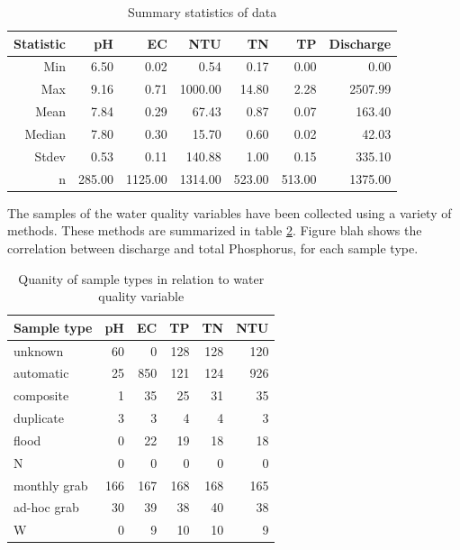 \documentclass[5p]{elsarticle}
\begin{document}
\begin{table}[ht]
\begin{center}
\caption{Summary statistics of data}
\begin{tiny}
\begin{tabular}{rrrrrrr}
  \hline
Statistic & pH & EC & NTU & TN & TP & Discharge \\ 
  \hline
Min & 6.50 & 0.02 & 0.54 & 0.17 & 0.00 & 0.00 \\ 
  Max & 9.16 & 0.71 & 1000.00 & 14.80 & 2.28 & 2507.99 \\ 
  Mean & 7.84 & 0.29 & 67.43 & 0.87 & 0.07 & 163.40 \\ 
  Median & 7.80 & 0.30 & 15.70 & 0.60 & 0.02 & 42.03 \\ 
  Stdev & 0.53 & 0.11 & 140.88 & 1.00 & 0.15 & 335.10 \\ 
  n & 285.00 & 1125.00 & 1314.00 & 523.00 & 513.00 & 1375.00 \\ 
   \hline
\end{tabular}
\end{tiny}
\label{table:summary_stats}
\end{center}
\end{table}
The samples of the water quality variables have been collected using a variety of methods. These methods are summarized in table \ref{table:sample_types}. Figure blah shows the correlation between discharge and total Phosphorus, for each sample type.

\begin{table}[ht]
\begin{center}
\caption{Quanity of sample types in relation to water quality variable}
\begin{tabular}{lrrrrr}
  \hline
 Sample type & pH & EC & TP & TN & NTU \\ 
  \hline
  unknown &  60 &   0 & 128 & 128 & 120 \\ 
  automatic &  25 & 850 & 121 & 124 & 926 \\ 
  composite &   1 &  35 &  25 &  31 &  35 \\ 
  duplicate &   3 &   3 &   4 &   4 &   3 \\ 
  flood &   0 &  22 &  19 &  18 &  18 \\ 
  N &   0 &   0 &   0 &   0 &   0 \\ 
  monthly grab & 166 & 167 & 168 & 168 & 165 \\ 
  ad-hoc grab &  30 &  39 &  38 &  40 &  38 \\ 
  W &   0 &   9 &  10 &  10 &   9 \\ 
   \hline
\end{tabular}
\label{table:sample_types}
\end{center}
\end{table}
\end{document}
